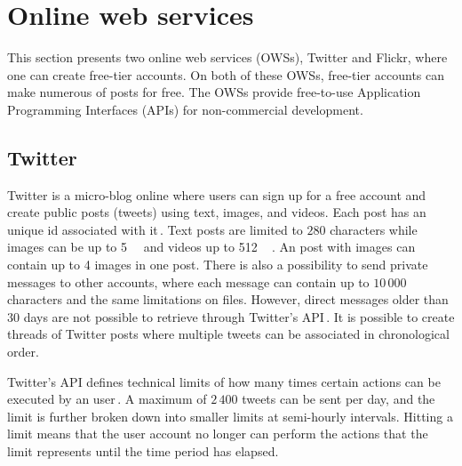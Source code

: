 \section{Online web services}
\label{sec:ows}
This section presents two online web services (OWSs), Twitter and Flickr, where one can create free-tier accounts. On both of these OWSs, free-tier accounts can make numerous of posts for free. The OWSs provide free-to-use Application Programming Interfaces (APIs) for non-commercial development. 

\subsection{Twitter}
\label{subsec:ows_twitter}
Twitter is a micro-blog online where users can sign up for a free account and create public posts (tweets) using text, images, and videos. Each post has an unique id associated with it\,\cite{twitterTwitterIDs}. Text posts are limited to $280$ characters while images can be up to \SI{5}{\mega\byte} and videos up to \SI{512}{\mega\byte}\,\cite{MediaBestPractices}. An post with images can contain up to 4 images in one post. There is also a possibility to send private messages to other accounts, where each message can contain up to $10\,000$ characters and the same limitations on files. However, direct messages older than $30$ days are not possible to retrieve through Twitter's API\,\cite{RetrievingOlder302018}. It is possible to create threads of Twitter posts where multiple tweets can be associated in chronological order.

Twitter's API defines technical limits of how many times certain actions can be executed by an user\,\cite{UnderstandingTwitterLimits}. A maximum of $2\,400$ tweets can be sent per day, and the limit is further broken down into smaller limits at semi-hourly intervals. Hitting a limit means that the user account no longer can perform the actions that the limit represents until the time period has elapsed.

